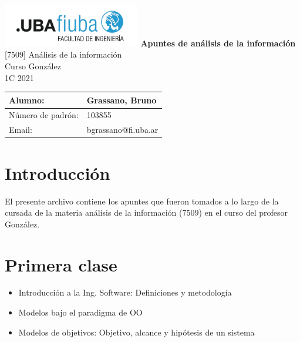 \documentclass[titlepage,a4paper]{article}
\begin{document}
\begin{titlepage} %
	\hfill\includegraphics[width=6cm]{logofiuba.jpg}
    \centering
    \vfill
    \Huge \textbf{Apuntes de análisis de la información}
    \vskip2cm
    \Large [7509] Análisis de la información\\
    Curso González \\
    1C 2021 
    \vfill
    \begin{tabular}{ | l | l | } %
      \hline
      Alumno: & Grassano, Bruno \\ \hline
      Número de padrón: & 103855 \\ \hline
      Email: & bgrassano@fi.uba.ar \\ \hline
  	\end{tabular}
    \vfill
    \vfill
\end{titlepage}

\tableofcontents %

\newpage

\section{Introducción}\label{sec:intro}
El presente archivo contiene los apuntes que fueron tomados a lo largo de la cursada de la materia análisis de la información (7509) en el curso del profesor González.



\section*{Primera clase}

\begin{itemize}
    \item Introducción a la Ing. Software: Definiciones y metodología
    \item Modelos bajo el paradigma de OO
    \item Modelos de objetivos: Objetivo, alcance y hipótesis de un sistema
\end{itemize}
\end{document}
